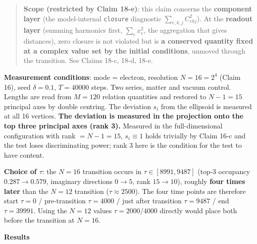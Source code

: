 \documentclass[
  10pt,
]{article}
\begin{document}
\begin{quote}
\textbf{Scope (restricted by Claim 18-e)}: this claim concerns the
\textbf{component layer} (the model-internal \texttt{closure} diagnostic
\(\sum_{e,k,j}C_{ekj}^2\)). At the \textbf{readout layer} (summing
harmonics first, \(\sum_e x_e^2\), the aggregation that gives
distances), zero closure is not violated but is \textbf{a conserved
quantity fixed at a complex value set by the initial conditions},
unmoved through the transition. See Claims 18-c, 18-d, 18-e.
\end{quote}

\textbf{Measurement conditions}: mode = electron, resolution
\(N = 16 = 2^4\) (Claim 16), seed \(\delta = 0.1\), \(T = 40000\) steps.
Two series, matter and vacuum control. Lengths are read from \(M = 120\)
relation quantities and restored to \(N-1 = 15\) principal axes by
double centring. The deviation \(s_i\) from the ellipsoid is measured at
all 16 vertices. \textbf{The deviation is measured in the projection
onto the top three principal axes (rank 3).} Measured in the
full-dimensional configuration with rank \(=N-1=15\), \(s_i \equiv 1\)
holds trivially by Claim 16-c and the test loses discriminating power;
rank 3 here is the condition for the test to have content.

\textbf{Choice of \(\tau\)}: the \(N=16\) transition occurs in
\(\tau\in[8991,9487]\) (top-3 occupancy \(0.287\to0.579\), imaginary
directions \(0\to5\), rank \(15\to10\)), roughly \textbf{four times
later} than the \(N=12\) transition (\(\tau\approx2500\)). The four time
points are therefore start \(\tau=0\) / pre-transition \(\tau=4000\) /
just after transition \(\tau=9487\) / end \(\tau=39991\). Using the
\(N=12\) values \(\tau=2000/4000\) directly would place both before the
transition at \(N=16\).

\textbf{Results}
\end{document}
